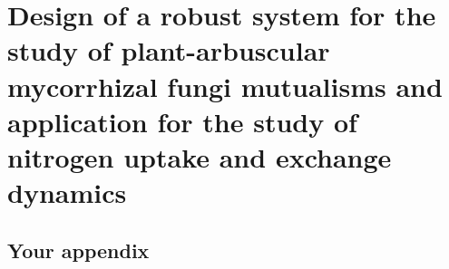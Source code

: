 \documentclass[PhD]{msu-thesis}
\begin{document}
\chapter{Design of a robust system for the study of plant-arbuscular mycorrhizal fungi mutualisms and application for the study of nitrogen uptake and exchange dynamics}
%
%
%
%
%
\begin{appendix}
	\chapter{Your appendix}
\end{appendix}
%
%
%
%
\backmatter
%
%
\makebibliographypage %
%
%
%
%
%
\end{document}
